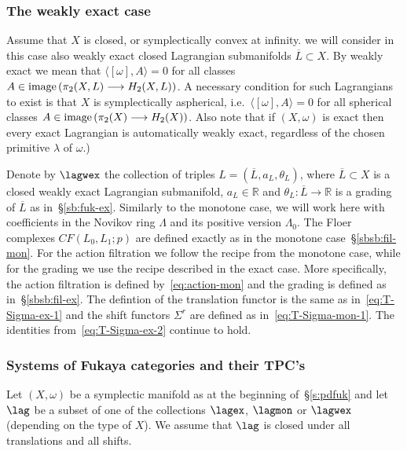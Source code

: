 \subsubsection{The weakly exact case} \label{sb:fuk-wex} Assume that
$X$ is closed, or symplectically convex at infinity. we will consider
in this case also weakly exact closed Lagrangian submanifolds
$\overline{L} \subset X$. By weakly exact we mean that
$\langle [\omega], A \rangle = 0$ for all classes
$A \in \textnormal{image\,} (\pi_2(X,L) \longrightarrow
H_2(X,L))$.  A necessary condition for such Lagrangians
to exist is that $X$ is symplectically aspherical,
i.e.~$\langle [\omega], A \rangle = 0$ for all spherical classes
$A \in \textnormal{image\,} (\pi_2(X) \longrightarrow H_2(X))$. Also
note that if $(X, \omega)$ is exact then every exact Lagrangian is
automatically weakly exact, regardless of the chosen primitive
$\lambda$ of $\omega$.)

Denote by $\lagwex$ the collection of triples
$L = (\overline{L}, a_L, \theta_L)$, where $\overline{L} \subset X$ is
a closed weakly exact Lagrangian submanifold, $a_L \in \mathbb{R}$ and
$\theta_L: \overline{L} \longrightarrow \mathbb{R}$ is a grading of
$\overline{L}$ as in~\S\ref{sb:fuk-ex}. Similarly to the monotone
case, we will work here with coefficients in the Novikov ring
$\Lambda$ and its positive version $\Lambda_0$. The Floer complexes
$CF(L_0, L_1; p)$ are defined exactly as in the monotone
case~\S\ref{sbsb:fil-mon}. For the action filtration we follow the
recipe from the monotone case, while for the grading we use the recipe
described in the exact case. More specifically, the action filtration
is defined by~\eqref{eq:action-mon} and the grading is defined as
in~\S\ref{sbsb:fil-ex}. The defintion of the translation functor is
the same as in~\eqref{eq:T-Sigma-ex-1} and the shift functors
$\Sigma^r$ are defined as in~\eqref{eq:T-Sigma-mon-1}. The identities
from~\eqref{eq:T-Sigma-ex-2} continue to hold.



\subsubsection{Systems of Fukaya categories and their
  TPC's} \label{sb:sys-fuk} Let $(X, \omega)$ be a symplectic manifold
as at the beginning of~\S\ref{s:pdfuk} and let $\lag$ be a subset of
one of the collections $\lagex$, $\lagmon$ or $\lagwex$ (depending on
the type of $X$). We assume that $\lag$ is closed under all
translations and all shifts.

